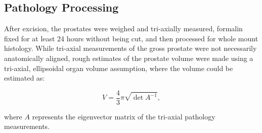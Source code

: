 \subsection{Pathology Processing}
After excision, the prostates were weighed and tri-axially measured, formalin
fixed for at least 24 hours without being cut, and then processed for whole
mount histology.  While tri-axial measurements of the gross prostate were not necessarily anatomically aligned, rough estimates of the prostate volume were made using a tri-axial, ellipsoidal organ volume assumption, where the volume could be estimated as:

\begin{equation}\label{eqn:ellipsoid_volume}
V = \frac{4}{3}\pi \sqrt{\det{A^{-1}}},
\end{equation}

where $A$ represents the eigenvector matrix of the tri-axial pathology
measurements.

